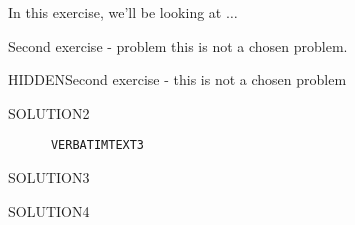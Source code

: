 \begin{intro}
	In this exercise, we'll be looking at \( \dots \)
\end{intro}
\begin{problem}
  Second exercise - problem this is not a chosen problem.
\end{problem}
\begin{problem}
  HIDDENSecond exercise - this is not a chosen problem
\end{problem}
\begin{solution}
	SOLUTION2
\end{solution}
\begin{problem}
  \lipsum[1]
\begin{verbatim}
      VERBATIMTEXT3
  \end{verbatim}
\end{problem}
\begin{solution}
	SOLUTION3
\end{solution}
\begin{problem}
\lipsum[2-3]
\end{problem}
\begin{solution}
	SOLUTION4
\end{solution}
\begin{problem}
\lipsum[4]
\end{problem}
